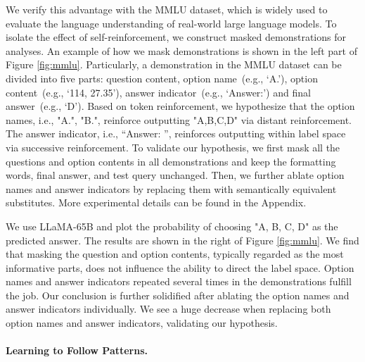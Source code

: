 \documentclass{article} %
\begin{document}
We verify this advantage with the MMLU dataset, which is widely used to evaluate the language understanding of real-world large language models.
To isolate the effect of self-reinforcement, we construct masked demonstrations for analyses. 
An example of how we mask demonstrations is shown in the left part of Figure \ref{fig:mmlu}. 
Particularly, a demonstration in the MMLU dataset can be divided into five parts: question content, option name~(e.g., `A.'), option content~(e.g., `114, 27.35'), answer indicator~(e.g., `Answer:') and final answer~(e.g., `D').  
Based on token reinforcement, we hypothesize that the option names, i.e., "A.", "B.", reinforce outputting "A,B,C,D" via distant reinforcement. The answer indicator, i.e., ``Answer: '', reinforces outputting within label space via successive reinforcement. 
To validate our hypothesis, we first mask all the questions and option contents in all demonstrations and keep the formatting words, final answer, and test query unchanged. 
Then, we further ablate option names and answer indicators by replacing them with semantically equivalent substitutes. 
More experimental details can be found in the Appendix. 


We use LLaMA-65B and plot the probability of choosing "A, B, C, D" as the predicted answer. The results are shown in the right of Figure \ref{fig:mmlu}. 
We find that masking the question and option contents, typically regarded as the most informative parts, does not influence the ability to direct the label space. 
Option names and answer indicators repeated several times in the demonstrations fulfill the job. 
Our conclusion is further solidified after ablating the option names and answer indicators individually. We see a huge decrease when replacing both option names and answer indicators, validating our hypothesis. 

\paragraph*{Learning to Follow Patterns.}
\end{document}
